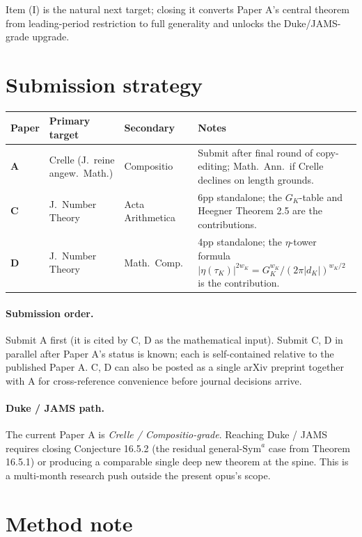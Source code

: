 \documentclass[11pt]{amsart}
\newcommand{\GK}{G_{K}}
\begin{document}
Item (I) is the natural next target; closing it converts Paper A's central
theorem from leading-period restriction to full generality and unlocks
the Duke/JAMS-grade upgrade.

\section{Submission strategy}

\begin{center}
\renewcommand{\arraystretch}{1.3}
\begin{tabular}{>{\bfseries}l l l l}
\toprule
Paper & Primary target & Secondary & Notes \\
\midrule
A & Crelle (J.\ reine angew.\ Math.) & Compositio & Submit after final round of
copy-editing; Math.\ Ann.\ if Crelle declines on length grounds. \\
C & J.\ Number Theory & Acta Arithmetica & 6pp standalone; the $\GK$-table and Heegner Theorem 2.5 are
the contributions. \\
D & J.\ Number Theory & Math.\ Comp.\ & 4pp standalone; the $\eta$-tower formula
$|\eta(\tau_K)|^{2 w_K} = \GK^{w_K}/(2\pi|d_K|)^{w_K/2}$ is the contribution. \\
\bottomrule
\end{tabular}
\end{center}

\paragraph{Submission order.} Submit A first (it is cited by C, D as
the mathematical input). Submit C, D in parallel after Paper A's
status is known; each is self-contained relative to the published Paper A.
C, D can also be posted as a single arXiv preprint together with A
for cross-reference convenience before journal decisions arrive.

\paragraph{Duke / JAMS path.} The current Paper A is
\emph{Crelle / Compositio-grade}. Reaching Duke / JAMS requires closing
Conjecture 16.5.2 (the residual general-$\mathrm{Sym}^{a}$ case from
Theorem 16.5.1) or producing a comparable single deep new theorem at the
spine. This is a multi-month research push outside the present
opus's scope.

\section{Method note}
\end{document}
